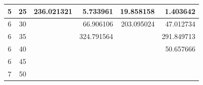 \begin{table}
\begin{tabular}{|c|c|r|r|r|r|}
	5                                                        & 25                                                      & 236.021321                       & 5.733961                                                                              & 19.858158                                                                                & 1.403642                                                                     \\ \hline
	6                                                        & 30                                                      &                                  & 66.906106                                                                             & 203.095024                                                                               & 47.012734                                                                     \\ \hline
	6                                                        & 35                                                      &                                  & 324.791564                                                                            &                                                                                          & 291.849713                                                                    \\ \hline
	6                                                        & 40                                                      &                                  &                                                                                       &                                                                                          & 50.657666                                                                    \\ \hline
	6                                                        & 45                                                      &                                  &                                                                                       &                                                                                          &                                                                               \\ \hline
	7                                                        & 50                                                      &                                  &                                                                                       &                                                                                          &                                                                               \\ \hline
	\end{tabular}
\end{table}

